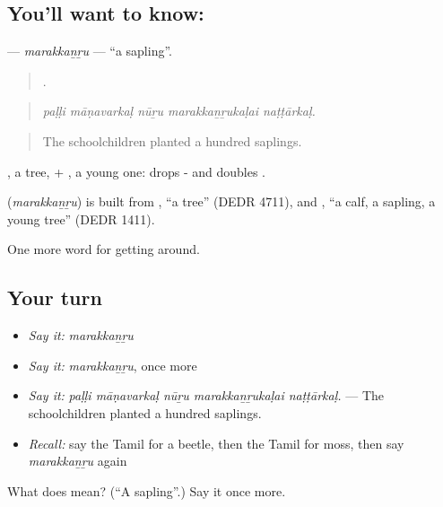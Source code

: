 \subsection*{You'll want to know: }
\textbf{} — \emph{marakkaṉṟu} — \textquotedblleft{}a sapling\textquotedblright{}.

\begin{quote}
    .
\end{quote}

\begin{quote}
\emph{paḷḷi māṇavarkaḷ nūṟu marakkaṉṟukaḷai naṭṭārkaḷ.}
\end{quote}

\begin{quote}
The schoolchildren planted a hundred saplings.
\end{quote}

, a tree, + , a young one:  drops - and doubles .

\begin{cousinweb}
\textbf{} (\emph{marakkaṉṟu}) is built from , \textquotedblleft{}a tree\textquotedblright{} (DEDR 4711), and , \textquotedblleft{}a calf, a sapling, a young tree\textquotedblright{} (DEDR 1411).
\end{cousinweb}

\begin{grammarlens}[title={What you've built}]
One more word for getting around.
\end{grammarlens}

\subsection*{Your turn}
\begin{itemize}
\raggedright
  \item \emph{Say it:} \emph{marakkaṉṟu}
  \item \emph{Say it:} \emph{marakkaṉṟu}, once more
  \item \emph{Say it:} \emph{paḷḷi māṇavarkaḷ nūṟu marakkaṉṟukaḷai naṭṭārkaḷ.} — The schoolchildren planted a hundred saplings.
  \item \emph{Recall:} say the Tamil for a beetle, then the Tamil for moss, then say \emph{marakkaṉṟu} again
\end{itemize}

\begin{tcolorbox}[breakable,colback=teal!4,colframe=teal!35!black,title={Before you move on}]
What does  mean? (\textquotedblleft{}A sapling\textquotedblright{}.) Say it once more.
\end{tcolorbox}
